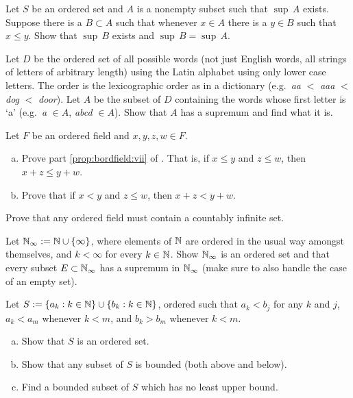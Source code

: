 \begin{exercise} \label{exercise:dominatingb}
Let $S$ be an ordered set and
$A$ is a nonempty subset such that $\sup \, A$ exists.  Suppose there
is a $B \subset A$ such that whenever $x \in A$ there is a $y \in B$
such that $x \leq y$.  Show that $\sup \, B$ exists and $\sup \, B = \sup \, A$.
\end{exercise}

\begin{exercise}
Let $D$ be the ordered set of all possible words (not just English words,
all strings of letters of arbitrary length)
using the Latin alphabet using only lower case letters.  The order is the
lexicographic order as in a dictionary (e.g.\ \emph{aa} $<$ \emph{aaa} $<$ \emph{dog} $<$ \emph{door}).
Let $A$ be the subset of $D$ containing the words whose
first letter is `a' (e.g.\ \emph{a} $\in A$, \emph{abcd} $\in A$).
Show that $A$ has a supremum and find what it is.
\end{exercise}

\begin{exercise}
Let $F$ be an ordered field and $x,y,z,w \in F$.
\begin{enumerate}[a)]
\item
Prove part \ref{prop:bordfield:vii} of .
That is,
if $x \leq y$ and $z \leq w$, then $x+z \leq y+w$.
\item
Prove that
if $x < y$ and $z \leq w$, then $x+z < y+w$.
\end{enumerate}
\end{exercise}

\begin{exercise}
Prove that any ordered field must contain a countably infinite set.
\end{exercise}

\begin{exercise}
Let ${\mathbb{N}}_{\infty} := {\mathbb{N}} \cup \{ \infty \}$, where elements of ${\mathbb{N}}$ are
ordered in the usual way amongst themselves,
and $k < \infty$ for every $k \in {\mathbb{N}}$.  Show ${\mathbb{N}}_{\infty}$ is an ordered set
and that every subset $E \subset {\mathbb{N}}_{\infty}$ has a supremum in
${\mathbb{N}}_{\infty}$ (make sure to also handle the case of an empty set).
\end{exercise}

\begin{exercise}
Let $S := \{ a_k : k \in {\mathbb{N}} \} \cup \{ b_k : k \in {\mathbb{N}} \}$, ordered such that
$a_k < b_j$ for any $k$ and $j$,
$a_k < a_m$ whenever $k < m$,
and $b_k > b_m$ whenever $k < m$.
\begin{enumerate}[a)]
\item
Show that $S$ is an ordered set.
\item
Show that any subset of $S$ is bounded (both above and below).
\item
Find a bounded subset of $S$ which has no least upper bound.
\end{enumerate}
\end{exercise}

